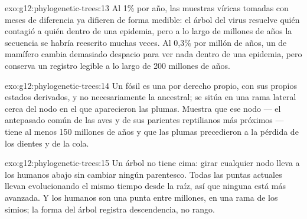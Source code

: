 \begin{solution}{exo:g12:phylogenetic-trees:13}
Al 1\% por año, las muestras víricas tomadas con meses de diferencia ya
difieren de forma medible: el árbol del virus resuelve quién contagió a
quién dentro de una epidemia, pero a lo largo de millones de años la
secuencia se habría reescrito muchas veces. Al 0,3\% por millón de
años, un  de mamífero cambia demasiado despacio para ver nada dentro
de una epidemia, pero conserva un registro legible a lo largo de 200
millones de años.
\end{solution}

\begin{solution}{exo:g12:phylogenetic-trees:14}
Un fósil es una  por derecho propio, con sus propios estados
derivados, y no necesariamente la  ancestral; se sitúa en una
rama lateral cerca del nodo en el que aparecieron las plumas. Muestra
que ese nodo --- el antepasado común de las aves y de sus parientes
reptilianos más próximos --- tiene al menos 150 millones de años y que
las plumas precedieron a la pérdida de los dientes y de la cola.
\end{solution}

\begin{solution}{exo:g12:phylogenetic-trees:15}
Un árbol no tiene cima: girar cualquier nodo lleva a los humanos abajo
sin cambiar ningún parentesco. Todas las puntas actuales llevan
evolucionando el mismo tiempo desde la raíz, así que ninguna está más
avanzada. Y los humanos son una punta entre millones, en una rama de
los simios; la forma del árbol registra descendencia, no rango.
\end{solution}

